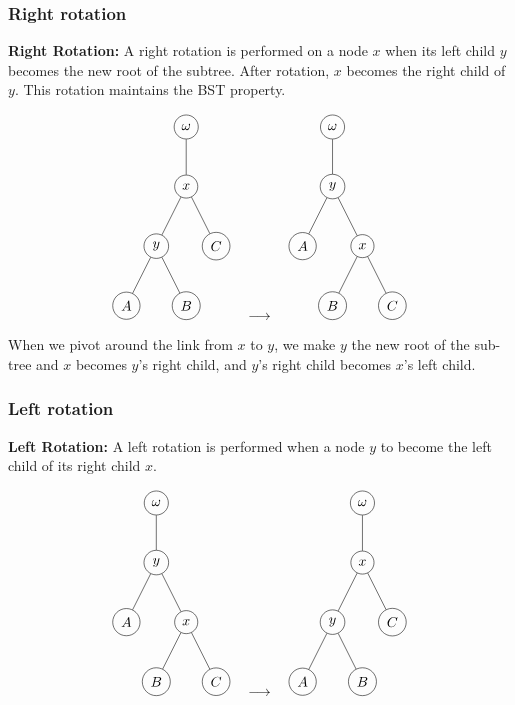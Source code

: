 \subsubsection{Right rotation}
\begin{definition}
    \textbf{Right Rotation:}
    A right rotation is performed on a node \( x \) when its left child \( y \) becomes the new root of the subtree. After rotation, \( x \) becomes the right child of \( y \). This rotation maintains the BST property.

    \[
    \begin{tikzpicture}[every node/.style={circle,draw},level distance=1.5cm, sibling distance=1.5cm]
    \node (w) {$\omega$}
        child {node (x) {$x$}
            child {node (y) {$y$}
                child {node (A) {$A$}}
                child {node (B) {$B$}}
            }
            child {node (C) {$C$}}
        };
    \end{tikzpicture}
    \quad
    \longrightarrow
    \quad
    \begin{tikzpicture}[every node/.style={circle,draw},level distance=1.5cm, sibling distance=1.5cm]
    \node (w) {$\omega$}
        child {node (y) {$y$}
            child {node (A) {$A$}}
            child {node (x) {$x$}
                child {node (B) {$B$}}
                child {node (C) {$C$}}
            }
        };
    \end{tikzpicture}
    \]
\end{definition}

\begin{intuition}
    When we pivot around the link from \( x \) to \( y \), we make \( y \) the new root of the sub-tree and \( x \) becomes \( y \)'s right child, and \( y \)'s right child becomes \( x \)'s left child.
\end{intuition}

\subsubsection{Left rotation}
\begin{definition}
    \textbf{Left Rotation:}
    A left rotation is performed when a node \( y \) to become the left child of its right child \( x \). 

    \[
    \begin{tikzpicture}[every node/.style={circle,draw},level distance=1.5cm, sibling distance=1.5cm]
    \node (w) {$\omega$}
        child {node (y) {$y$}
            child {node (A) {$A$}}
            child {node (x) {$x$}
                child {node (B) {$B$}}
                child {node (C) {$C$}}
            }
        };
    \end{tikzpicture}
    \quad
    \longrightarrow
    \quad
    \begin{tikzpicture}[every node/.style={circle,draw},level distance=1.5cm, sibling distance=1.5cm]
    \node (w) {$\omega$}
        child {node (x) {$x$}
            child {node (y) {$y$}
                child {node (A) {$A$}}
                child {node (B) {$B$}}
            }
            child {node (C) {$C$}}
        };
    \end{tikzpicture}
    \]
\end{definition}

